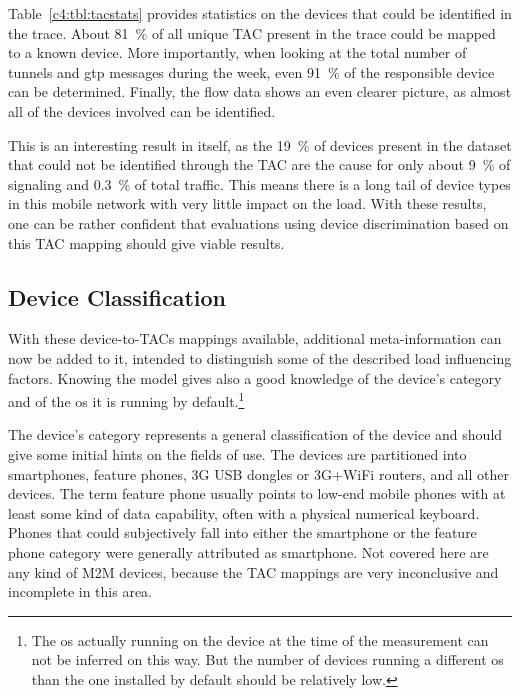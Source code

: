 Table~\ref{c4:tbl:tacstats} provides statistics on the devices that could be identified in the trace. About \SI{81}{\percent} of all unique \gls{TAC} present in the trace could be mapped to a known device. More importantly, when looking at the total number of tunnels and \gls{gtp} messages during the week, even \SI{91}{\percent} of the responsible device can be determined. Finally, the flow data shows an even clearer picture, as almost all of the devices involved can be identified.

This is an interesting result in itself, as the \SI{19}{\percent} of devices present in the dataset that could not be identified through the \gls{TAC} are the cause for only about \SI{9}{\percent} of signaling and \SI{0.3}{\percent} of total traffic. This means there is a long tail of device types in this mobile network with very little impact on the load. With these results, one can be rather confident that evaluations using device discrimination based on this \gls{TAC} mapping should give viable results.


\subsection{Device Classification}

With these device-to-\glspl{TAC} mappings available, additional meta-information can now be added to it, intended to distinguish some of the described load influencing factors. Knowing the model gives also a good knowledge of the device's category and of the \gls{os} it is running by default.\footnote{The \gls{os} actually running on the device at the time of the measurement can not be inferred on this way. But the number of devices running a different \gls{os} than the one installed by default should be relatively low.}

The device's category represents a general classification of the device and should give some initial hints on the fields of use. The devices are partitioned into smartphones, feature phones, \gls{3G} USB dongles or \gls{3G}+WiFi routers, and all other devices. The term feature phone usually points to low-end mobile phones with at least some kind of data capability, often with a physical numerical keyboard. Phones that could subjectively fall into either the smartphone or the feature phone category were generally attributed as smartphone. Not covered here are any kind of \gls{M2M} devices, because the \gls{TAC} mappings are very inconclusive and incomplete in this area.

